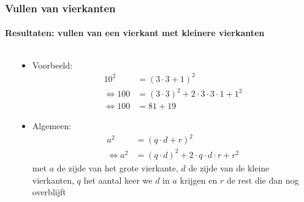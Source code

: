 \begin{frame}
  \frametitle{Vullen van vierkanten}
  \framesubtitle{Resultaten: vullen van een vierkant met kleinere vierkanten}
  \begin{columns}
    \begin{column}{0.5\textwidth}
      
    \end{column}
    \begin{column}{0.5\textwidth}
    \begin{itemize}
      \item Voorbeeld:
      \begin{align*}
        10^2  &= (3\cdot 3 + 1)^2\\
        \Leftrightarrow 100   &= (3\cdot 3)^2 + 2\cdot 3\cdot 3\cdot 1 + 1^2\\
        \Leftrightarrow 100   &= 81 + 19
      \end{align*}
      \pause
      \item Algemeen:
      \begin{align*}
         a^2  &= (q\cdot d + r)^2\\
        \Leftrightarrow a^2   &= (q\cdot d)^2 + 2\cdot q\cdot d\cdot r + r^2
      \end{align*}
      {\tiny met $a$ de zijde van het grote vierkante, $d$ de zijde van de kleine vierkanten, $q$ het aantal keer we $d$ in $a$ krijgen en $r$ de rest die dan nog overblijft}
    \end{itemize}
    \end{column}
  \end{columns}  
\end{frame}

